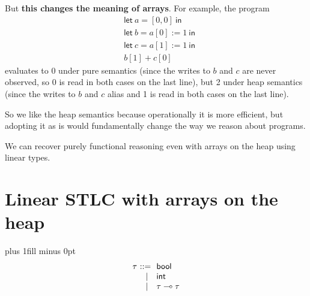 \documentclass{article}
\newcommand{\bnfeq}{&::=&}
\newcommand{\bnfalt}{&~\mid&}
\newcommand{\kw}[1]{\ensuremath{\mathsf{#1}}}
\newcommand{\unit}{\ensuremath{\kw{unit}}}
\newcommand{\bool}{\ensuremath{\kw{bool}}}
\newcommand{\tyint}{\ensuremath{\kw{int}}}
\newcommand{\linto}{\ensuremath{\multimap}}
\newcommand{\letin}[2]{\kw{let}\ #1 = #2\ \kw{in}}
\begin{document}
But \textbf{this changes the meaning of arrays}. For example, the program
\begin{align*}
  &\letin{a}{[0, 0]}\\
  &\letin{b}{a[0] := 1}\\
  &\letin{c}{a[1] := 1}\\
  &b[1] + c[0]
\end{align*}
evaluates to 0 under pure semantics (since the writes to $b$ and $c$
are never observed, so 0 is read in both cases on the last line), but
2 under heap semantics (since the writes to $b$ and $c$ alias and 1 is
read in both cases on the last line).

So we like the heap semantics because operationally it is more
efficient, but adopting it as is would fundamentally change the way
we reason about programs.

We can recover purely functional reasoning even with arrays on the
heap using linear types.

\section*{Linear STLC with arrays on the heap}

{
\noindent
\hskip 1cm plus 1fill minus 0pt
\[
\begin{array}{r@{~}c@{~~}l}
  \tau \bnfeq
       \bool\\
       \bnfalt \tyint\\
       \bnfalt \tau\linto\tau\\\\
\end{array}
\]
}
\end{document}
